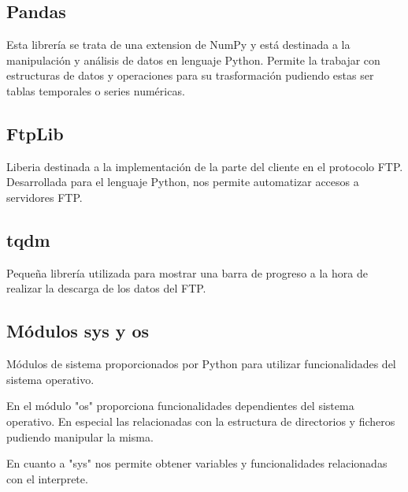 \subsection{Pandas}\label{pandas}
Esta librería se trata de una extension de NumPy y está destinada a la manipulación y análisis de datos en lenguaje Python. Permite la trabajar con estructuras de datos y operaciones para su trasformación pudiendo estas ser tablas temporales o series numéricas.
\subsection{FtpLib}\label{FtpLib}
Liberia destinada a la implementación de la parte del cliente en el protocolo FTP. Desarrollada para el lenguaje Python, nos permite automatizar accesos a servidores FTP.
\subsection{tqdm}\label{tqdm}
Pequeña librería utilizada para mostrar una barra de progreso a la hora de realizar la descarga de los datos del FTP.
\subsection{Módulos sys y os}\label{sys/os}
Módulos de sistema proporcionados por Python para utilizar funcionalidades del sistema operativo.

En el módulo "os" proporciona funcionalidades dependientes del sistema operativo. En especial las relacionadas con la estructura de directorios y ficheros pudiendo manipular la misma.

En cuanto a "sys" nos permite obtener variables y funcionalidades relacionadas con el interprete.